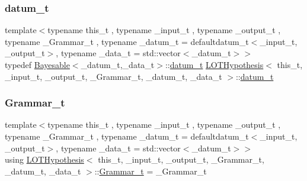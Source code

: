 \subsubsection{\texorpdfstring{datum\+\_\+t}{datum\_t}}
{\footnotesize\ttfamily template$<$typename this\+\_\+t , typename \+\_\+input\+\_\+t , typename \+\_\+output\+\_\+t , typename \+\_\+\+Grammar\+\_\+t , typename \+\_\+datum\+\_\+t  = defaultdatum\+\_\+t$<$\+\_\+input\+\_\+t, \+\_\+output\+\_\+t$>$, typename \+\_\+data\+\_\+t  = std\+::vector$<$\+\_\+datum\+\_\+t$>$$>$ \\
typedef \hyperlink{class_bayesable}{Bayesable}$<$\+\_\+datum\+\_\+t,\+\_\+data\+\_\+t$>$\+::\hyperlink{class_l_o_t_hypothesis_a3da7a75d135620a3d48a3bfe0be11401}{datum\+\_\+t} \hyperlink{class_l_o_t_hypothesis}{L\+O\+T\+Hypothesis}$<$ this\+\_\+t, \+\_\+input\+\_\+t, \+\_\+output\+\_\+t, \+\_\+\+Grammar\+\_\+t, \+\_\+datum\+\_\+t, \+\_\+data\+\_\+t $>$\+::\hyperlink{class_l_o_t_hypothesis_a3da7a75d135620a3d48a3bfe0be11401}{datum\+\_\+t}}

\mbox{\label{class_l_o_t_hypothesis_a5393058e614835e0f139bd40acb183b2}} 
\subsubsection{\texorpdfstring{Grammar\+\_\+t}{Grammar\_t}}
{\footnotesize\ttfamily template$<$typename this\+\_\+t , typename \+\_\+input\+\_\+t , typename \+\_\+output\+\_\+t , typename \+\_\+\+Grammar\+\_\+t , typename \+\_\+datum\+\_\+t  = defaultdatum\+\_\+t$<$\+\_\+input\+\_\+t, \+\_\+output\+\_\+t$>$, typename \+\_\+data\+\_\+t  = std\+::vector$<$\+\_\+datum\+\_\+t$>$$>$ \\
using \hyperlink{class_l_o_t_hypothesis}{L\+O\+T\+Hypothesis}$<$ this\+\_\+t, \+\_\+input\+\_\+t, \+\_\+output\+\_\+t, \+\_\+\+Grammar\+\_\+t, \+\_\+datum\+\_\+t, \+\_\+data\+\_\+t $>$\+::\hyperlink{class_l_o_t_hypothesis_a5393058e614835e0f139bd40acb183b2}{Grammar\+\_\+t} =  \+\_\+\+Grammar\+\_\+t}

\mbox{\label{class_l_o_t_hypothesis_aeb5adc395a32008d9fe1b5fb7ba75e95}} 
